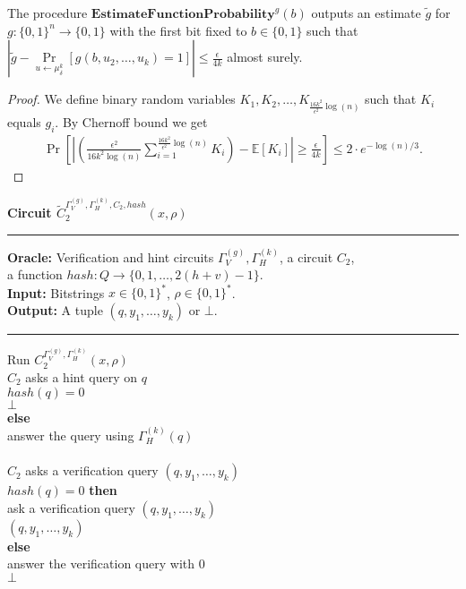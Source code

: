 %
\begin{lemma}
  \label{lemma:estimate_of_g}
  The procedure $\textbf{EstimateFunctionProbability}^g(b)$ outputs an estimate $\widetilde{g}$
  for $g: \{0,1\}^{n} \rightarrow \{0,1\}$ with the first bit fixed to $b \in \{0,1\}$
  such that $| \widetilde{g} - \underset{u \leftarrow \mu_{\delta}^{k}}{\Pr}\left[g(b,u_2, \dots, u_k) = 1\right] | \leq \frac{\epsilon}{4k}$ almost surely.
\end{lemma}
%
\begin{proof}
We define binary random variables $K_1, K_2, \dots, K_{\frac{16k^2}{\epsilon^2}\log(n)}$ such that $K_i$ equals $g_i$. By Chernoff bound we get
\begin{align*}
  \Pr \left[\left|\left(\frac{\epsilon^2}{16k^2 \log(n)} \sum_{i=1}^{\frac{16k^2}{\epsilon^2}\log(n)} K_i \right) - \mathbb{E}[K_i]\right|
    \geq \frac{\epsilon}{4k} \right] \leq 2 \cdot e^{-\log(n)/3}.
\end{align*}
\end{proof}
%
\begin{codeblock}
  \textbf{Circuit $\widetilde{C}_2^{\Gamma_V^{(g)}, \Gamma_H^{(k)}, C_2, hash} (x, \rho)$}
  \medskip \hrule \medskip
  \textbf{Oracle:} Verification and hint circuits $\Gamma_V^{(g)}, \Gamma_H^{(k)}$, a circuit $C_2$, \\
  \IndII a function $hash : Q \rightarrow \{0,1,\dots, 2(h+v)-1\}$. \\
  \textbf{Input:} Bitstrings $x \in \{0,1\}^{*}$, $\rho \in \{0,1\}^{*}$. \\
  \textbf{Output:} A tuple $(q, y_1, \dots, y_k)$ or $\bot$.
  \medskip\hrule\medskip
  Run $C_2^{\Gamma_V^{(g)},\Gamma_H^{(k)}}(x, \rho)$ \\
  \IndI \If $C_2$ asks a hint query on $q$ \then\\
  \IndII \If $hash(q) = 0$ \then\\
  \IndIII \return $\bot$\\
  \IndII \textbf{else}\\
  \IndIII answer the query using $\Gamma_H^{(k)}(q)$\\
  \\
  \IndI \If $C_2$ asks a verification query $(q, y_1, \dots, y_k)$ \then \\
  \IndII \If $hash(q) = 0 $ \textbf{then} \\
  \IndIII ask a verification query $(q, y_1, \dots, y_k)$ \\
  \IndIII \return $(q, y_1, \dots, y_k)$ \\
  \IndII \textbf{else} \\
  \IndIII answer the verification query with 0 \\
  \return $\bot$
\end{codeblock}
